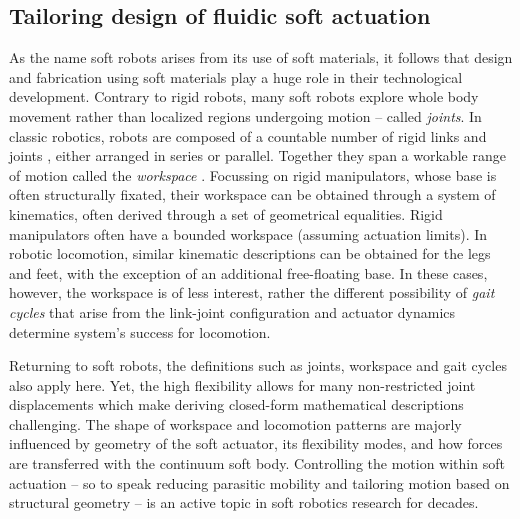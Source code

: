 \subsection{Tailoring design of fluidic soft actuation}
As the name soft robots arises from its use of soft materials, it follows that design and fabrication using soft materials play a huge role in their technological development. Contrary to rigid robots, many soft robots explore whole body movement rather than localized regions undergoing motion -- called \textit{joints}. In classic robotics, robots are composed of a countable number of rigid links and joints \cite{Spong2006,Murray1994,Corke2011}, either arranged in series or parallel. Together they span a workable range of motion called the \textit{workspace} \cite{Spong2006}. Focussing on rigid manipulators, whose base is often structurally fixated, their workspace can be obtained through a system of kinematics, often derived through a set of geometrical equalities. Rigid manipulators often have a bounded workspace (assuming actuation limits). In robotic locomotion, similar kinematic descriptions can be obtained for the legs and feet, with the exception of an additional free-floating base. In these cases, however, the workspace is of less interest, rather the different possibility of \textit{gait cycles} that arise from the link-joint configuration and actuator dynamics determine system's success for locomotion. 

Returning to soft robots, 
the definitions such as {joints}, {workspace} and {gait cycles} also apply here. Yet, the high flexibility allows for many non-restricted joint displacements which make deriving closed-form mathematical descriptions challenging. The shape of workspace and locomotion patterns are majorly influenced by geometry of the soft actuator, its flexibility modes, and how forces are transferred with the continuum soft body. Controlling the motion within soft actuation -- so to speak reducing parasitic mobility and tailoring motion based on structural geometry -- is an active topic in soft robotics research for decades. \\

